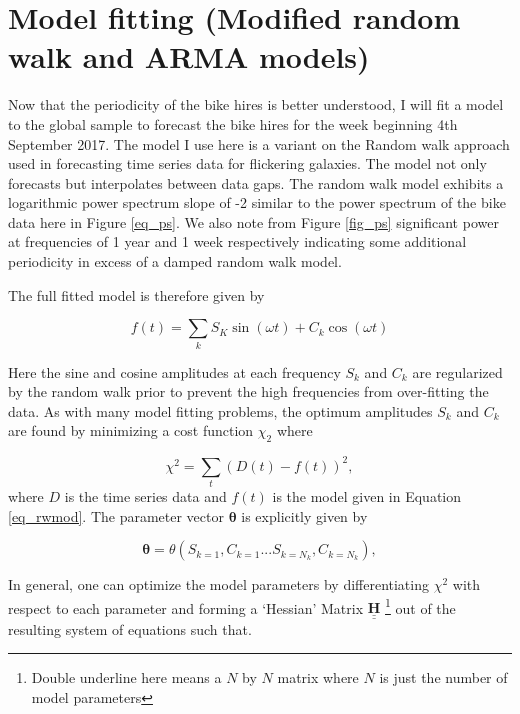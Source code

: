 \documentclass[10pt]{article}
\begin{document}
\section{Model fitting (Modified random walk and ARMA models)}
\label{sec_model}


Now that the periodicity of the bike hires is better understood, I will fit a model to the global sample to forecast the bike hires for the week beginning 4th September 2017. The model I use here is a variant on the Random walk approach used in forecasting time series data for flickering galaxies. The model not only forecasts but interpolates between data gaps. The random walk model exhibits a logarithmic power spectrum slope of -2 similar to the power spectrum of the bike data here in Figure \ref{eq_ps}. We also note from Figure \ref{fig_ps} significant power at frequencies of 1 year and 1 week respectively indicating some additional periodicity in excess of a damped random walk model.

The full fitted model is therefore given by

\begin{equation}
\label{eq_rwmod}
f(t) = \sum_k S_K \sin \left( \omega t \right) + C_k \cos \left( \omega t \right)
\end{equation}

Here the sine and cosine amplitudes at each frequency $S_k$ and $C_k$ are regularized by the random walk prior to prevent the high frequencies from over-fitting the data. As with many model fitting problems, the optimum amplitudes $S_k$ and $C_k$ are found by minimizing a cost function $\chi_2$ where

\begin{equation}
\label{eq_cost}
\chi^2 = \sum_t \left( D(t)-f(t) \right)^2,
\end{equation}
\noindent where $D$ is the time series data and $f(t)$ is the model given in Equation \ref{eq_rwmod}. The parameter vector $\mathbf{\theta}$ is explicitly given by

\begin{equation}
\mathbf{\theta} = \theta \left(S_{k=1},C_{k=1} ...S_{k=N_k},C_{k=N_k} \right),
\end{equation}


In general, one can optimize the model parameters by differentiating $\chi^2$ with respect to each parameter and forming a `Hessian' Matrix $\underline{\underline{\mathbf{H}}}$ \footnote{Double underline here means a $N$ by $N$ matrix where $N$ is just the number of model parameters} out of the resulting system of equations such that.
\end{document}
